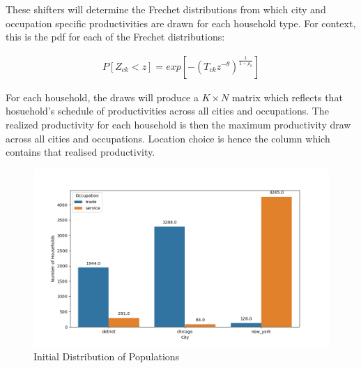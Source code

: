 \documentclass[10pt]{article}
\begin{document}
\vspace{2em}

These shifters will determine the Frechet distributions from which city and occupation specific productivities are drawn for each household type. For context, this is the pdf for each of the Frechet distributions:

\begin{align}
    P[Z_{ck} < z] = exp[-(T_{ck} z^{-\theta})^{\frac{1}{1 - \rho_k}}]
\end{align}

For each household, the draws will produce a $K \times N$ matrix which reflects that hosuehold's schedule of productivities across all cities and occupations. The realized productivity for each household is then the maximum productivity draw across all cities and occupations. Location choice is hence the column which contains that realised productivity.


\begin{figure}
    \centering
    \includegraphics[width=\textwidth]{../simulations/graphs/city_pop.png}
    \caption{Initial Distribution of Populations}
    \label{city_pop}
\end{figure}
\end{document}

